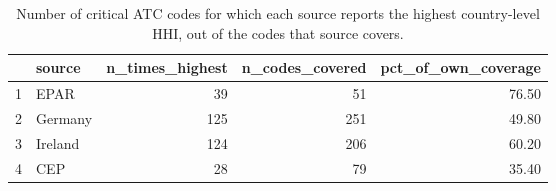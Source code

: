 \begin{table}[ht]
\centering
\begin{tabular}{rlrrr}
  \hline
 & source & n\_times\_highest & n\_codes\_covered & pct\_of\_own\_coverage \\ 
  \hline
1 & EPAR &  39 &  51 & 76.50 \\ 
  2 & Germany & 125 & 251 & 49.80 \\ 
  3 & Ireland & 124 & 206 & 60.20 \\ 
  4 & CEP &  28 &  79 & 35.40 \\ 
   \hline
\end{tabular}
\caption{Number of critical ATC codes for which each source reports the highest country-level HHI, out of the codes that source covers.} 
\label{tab:hhi_highest_by_sourceT}
\end{table}
